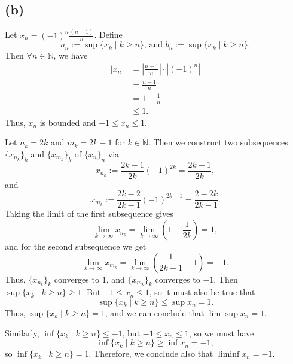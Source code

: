 \documentclass{article}
\begin{document}
\subsection*{(b)}
Let $x_n = (-1)^n\frac{(n-1)}{n}$. Define
\begin{equation}
	a_n := \sup\{x_k \;|\; k\geq n\} \textrm{, and } b_n := \sup\{x_k \;|\; k\geq n\}.
\end{equation}
Then $\forall n \in \mathbb{N}$, we have 
\begin{align}
	|x_n| &= \left|\frac{n-1}{n}\right| \cdot |(-1)^n| \\
	&= \frac{n-1}{n} \\
	&= 1-\frac{1}{n} \\
	&\leq 1.
\end{align}
Thus, $x_n$ is bounded and $-1\leq x_n \leq 1$. 

Let $n_k=2k$ and $m_k=2k-1$ for $k\in\mathbb{N}$. Then we construct two subsequences $\{x_{n_k}\}_k$ and $\{x_{m_k}\}_k$ of $\{x_n\}_n$ via
\begin{equation}
	x_{n_k} := \frac{2k-1}{2k}(-1)^{2k} = \frac{2k-1}{2k},
\end{equation}
and
\begin{equation}
	x_{m_k} := \frac{2k-2}{2k-1}(-1)^{2k-1} = \frac{2-2k}{2k-1}.
\end{equation}
Taking the limit of the first subsequence gives 
\begin{equation}
	\lim_{k \to \infty} x_{n_k} = \lim_{k \to\infty} \left(1-\frac{1}{2k}\right) = 1,
\end{equation}
and for the second subsequence we get
\begin{equation}
	\lim_{k\to\infty} x_{m_k} = \lim_{k \to \infty}\left(\frac{1}{2k-1}-1\right)=-1.
\end{equation}
Thus, $\{x_{n_k}\}_k$ converges to $1$, and $\{x_{m_k}\}_k$ converges to $-1$. Then \\$\sup\{x_k \;|\; k\geq n\} \geq 1$. But $-1\leq x_n \leq 1$, so it must also be true that
\begin{equation}
	\sup\{x_k \;|\; k\geq n\} \leq \sup x_n = 1.
\end{equation}
Thus, $\sup\{x_k \;|\; k\geq n\}=1$, and we can conclude that $\lim\sup x_n =1$.

Similarly, $\inf\{x_k \;|\; k\geq n\}\leq -1$, but $-1\leq x_n \leq 1$, so we must have
\begin{equation}
	\inf \{x_k \;|\; k\geq n\} \geq \inf x_n = -1,
\end{equation}
so $\inf \{x_k \;|\; k\geq n\}=1$. Therefore, we conclude also that $\liminf x_n = -1$.
\end{document}
